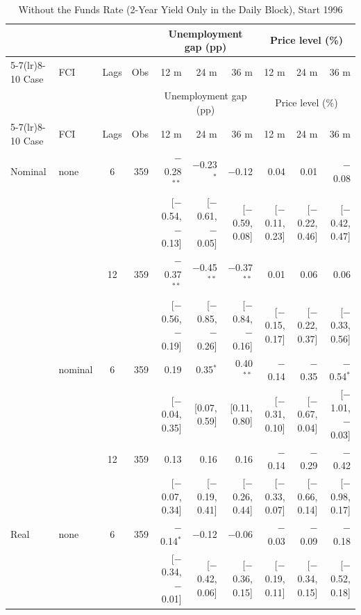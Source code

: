 \begingroup\scriptsize\setlength{\tabcolsep}{0.9pt}
\begin{longtable}{llcrrrrrrr}
\caption{Without the Funds Rate (2-Year Yield Only in the Daily Block), Start 1996}\label{tab:appR5}\\
\toprule
 & & & & \multicolumn{3}{c}{Unemployment gap (pp)} & \multicolumn{3}{c}{Price level (\%)}\\ \cmidrule(lr){5-7}\cmidrule(lr){8-10}
Case & FCI & Lags & Obs & 12 m & 24 m & 36 m & 12 m & 24 m & 36 m\\
\midrule\endfirsthead
\toprule
 & & & & \multicolumn{3}{c}{Unemployment gap (pp)} & \multicolumn{3}{c}{Price level (\%)}\\ \cmidrule(lr){5-7}\cmidrule(lr){8-10}
Case & FCI & Lags & Obs & 12 m & 24 m & 36 m & 12 m & 24 m & 36 m\\
\midrule\endhead
\bottomrule\endfoot
Nominal & none & 6 & 359 & $-$0.28$^{**}$ & $-$0.23$^{*}$ & $-$0.12 & 0.04 & 0.01 & $-$0.08\\
 & & & & {\scriptsize [$-$0.54, $-$0.13]} & {\scriptsize [$-$0.61, $-$0.05]} & {\scriptsize [$-$0.59, 0.08]} & {\scriptsize [$-$0.11, 0.23]} & {\scriptsize [$-$0.22, 0.46]} & {\scriptsize [$-$0.42, 0.47]}\\
 &  & 12 & 359 & $-$0.37$^{**}$ & $-$0.45$^{**}$ & $-$0.37$^{**}$ & 0.01 & 0.06 & 0.06\\
 & & & & {\scriptsize [$-$0.56, $-$0.19]} & {\scriptsize [$-$0.85, $-$0.26]} & {\scriptsize [$-$0.84, $-$0.16]} & {\scriptsize [$-$0.15, 0.17]} & {\scriptsize [$-$0.22, 0.37]} & {\scriptsize [$-$0.33, 0.56]}\\
 & nominal & 6 & 359 & 0.19 & 0.35$^{*}$ & 0.40$^{**}$ & $-$0.14 & $-$0.35 & $-$0.54$^{*}$\\
 & & & & {\scriptsize [$-$0.04, 0.35]} & {\scriptsize [0.07, 0.59]} & {\scriptsize [0.11, 0.80]} & {\scriptsize [$-$0.31, 0.10]} & {\scriptsize [$-$0.67, 0.04]} & {\scriptsize [$-$1.01, $-$0.03]}\\
 &  & 12 & 359 & 0.13 & 0.16 & 0.16 & $-$0.14 & $-$0.29 & $-$0.42\\
 & & & & {\scriptsize [$-$0.07, 0.34]} & {\scriptsize [$-$0.19, 0.41]} & {\scriptsize [$-$0.26, 0.44]} & {\scriptsize [$-$0.33, 0.07]} & {\scriptsize [$-$0.66, 0.14]} & {\scriptsize [$-$0.98, 0.17]}\\
\addlinespace
Real & none & 6 & 359 & $-$0.14$^{*}$ & $-$0.12 & $-$0.06 & $-$0.03 & $-$0.09 & $-$0.18\\
 & & & & {\scriptsize [$-$0.34, $-$0.01]} & {\scriptsize [$-$0.42, 0.06]} & {\scriptsize [$-$0.36, 0.15]} & {\scriptsize [$-$0.19, 0.11]} & {\scriptsize [$-$0.34, 0.15]} & {\scriptsize [$-$0.52, 0.18]}\\

\end{longtable}
